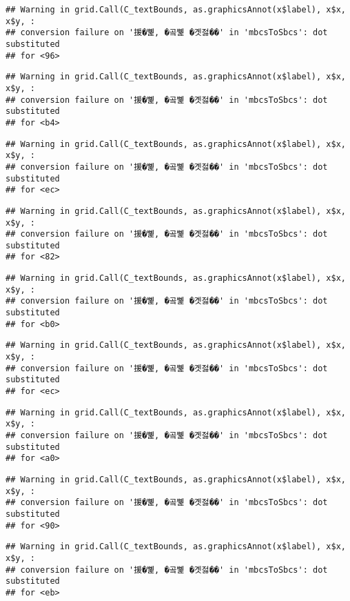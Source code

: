 \documentclass[
]{article}
\begin{document}
\begin{verbatim}
## Warning in grid.Call(C_textBounds, as.graphicsAnnot(x$label), x$x, x$y, :
## conversion failure on '援�뼱, �곸뼱 �곗젏��' in 'mbcsToSbcs': dot substituted
## for <96>
\end{verbatim}

\begin{verbatim}
## Warning in grid.Call(C_textBounds, as.graphicsAnnot(x$label), x$x, x$y, :
## conversion failure on '援�뼱, �곸뼱 �곗젏��' in 'mbcsToSbcs': dot substituted
## for <b4>
\end{verbatim}

\begin{verbatim}
## Warning in grid.Call(C_textBounds, as.graphicsAnnot(x$label), x$x, x$y, :
## conversion failure on '援�뼱, �곸뼱 �곗젏��' in 'mbcsToSbcs': dot substituted
## for <ec>
\end{verbatim}

\begin{verbatim}
## Warning in grid.Call(C_textBounds, as.graphicsAnnot(x$label), x$x, x$y, :
## conversion failure on '援�뼱, �곸뼱 �곗젏��' in 'mbcsToSbcs': dot substituted
## for <82>
\end{verbatim}

\begin{verbatim}
## Warning in grid.Call(C_textBounds, as.graphicsAnnot(x$label), x$x, x$y, :
## conversion failure on '援�뼱, �곸뼱 �곗젏��' in 'mbcsToSbcs': dot substituted
## for <b0>
\end{verbatim}

\begin{verbatim}
## Warning in grid.Call(C_textBounds, as.graphicsAnnot(x$label), x$x, x$y, :
## conversion failure on '援�뼱, �곸뼱 �곗젏��' in 'mbcsToSbcs': dot substituted
## for <ec>
\end{verbatim}

\begin{verbatim}
## Warning in grid.Call(C_textBounds, as.graphicsAnnot(x$label), x$x, x$y, :
## conversion failure on '援�뼱, �곸뼱 �곗젏��' in 'mbcsToSbcs': dot substituted
## for <a0>
\end{verbatim}

\begin{verbatim}
## Warning in grid.Call(C_textBounds, as.graphicsAnnot(x$label), x$x, x$y, :
## conversion failure on '援�뼱, �곸뼱 �곗젏��' in 'mbcsToSbcs': dot substituted
## for <90>
\end{verbatim}

\begin{verbatim}
## Warning in grid.Call(C_textBounds, as.graphicsAnnot(x$label), x$x, x$y, :
## conversion failure on '援�뼱, �곸뼱 �곗젏��' in 'mbcsToSbcs': dot substituted
## for <eb>
\end{verbatim}
\end{document}
